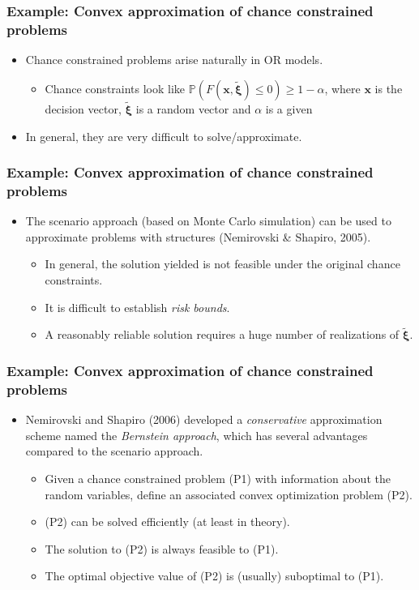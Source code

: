 \documentclass{beamer}
\begin{document}
\begin{frame}
	\frametitle{Example: Convex approximation of chance constrained problems}
	\begin{itemize}
		\item Chance constrained problems arise naturally in OR models. 
		\begin{itemize}
			\item Chance constraints look like $\mathbb{P}\left(F\left(\boldsymbol{x},\tilde{\boldsymbol{\xi}}\right)\leq 0\right)\geq 1-\alpha$, where $\boldsymbol{x}$ is the decision vector, $\tilde{\boldsymbol{\xi}}$ is a random vector and $\alpha$ is a given 
		\end{itemize}
		\item In general, they are very difficult to solve/approximate.
	\end{itemize}
\end{frame}

\begin{frame}
	\frametitle{Example: Convex approximation of chance constrained problems}
	\begin{itemize}
			\item The scenario approach (based on Monte Carlo simulation) can be used to approximate problems with  structures (Nemirovski \& Shapiro, 2005).
			\begin{itemize}
				\item In general, the solution yielded is not feasible under the original chance constraints.
				\item It is difficult to establish \textit{risk bounds}.
				\item A reasonably reliable solution requires a huge number of realizations of $\tilde{\boldsymbol{\xi}}$.
			\end{itemize}
	\end{itemize}
\end{frame}

\begin{frame}
	\frametitle{Example: Convex approximation of chance constrained problems}
	\begin{itemize}
		\item Nemirovski and Shapiro (2006) developed a \textit{conservative} approximation scheme named the \textit{Bernstein approach}, which has several advantages compared to the scenario approach.
		\begin{itemize}
			\item Given a  chance constrained problem (P1) with information about the random variables, define an associated convex optimization problem (P2).
			\item (P2) can be solved efficiently (at least in theory).
			\item The solution to (P2) is always feasible to (P1).
			\item The optimal objective value of (P2) is (usually) suboptimal to (P1).
		\end{itemize}
	\end{itemize}
\end{frame}
\end{document}
